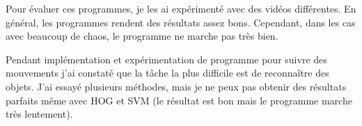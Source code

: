 \documentclass[french,12pt,a4paper,oneside,notitlepage]{report}
\begin{document}
Pour évaluer ces programmes, je les ai expérimenté avec des vidéos différentes. En 
général, les programmes rendent des résultats assez bons. Cependant, dans les cas avec 
beaucoup de chaos, le programme ne marche pas très bien.

Pendant implémentation et expérimentation de programme pour suivre des mouvements j'ai 
constaté que la tâche la plus difficile est de reconnaître des objets. J'ai essayé 
plusieurs méthodes, mais je ne peux pas obtenir des résultats parfaits même avec HOG et 
SVM (le résultat est bon mais le programme marche très lentement). 
\end{document}
